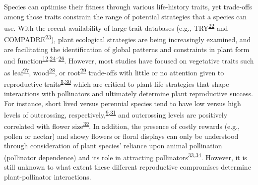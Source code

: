 \documentclass[
  12pt,
  a4paper,
]{article}
\begin{document}
Species can optimise their fitness through various life-history traits, yet trade-offs among those traits constrain the range of potential strategies that a species can use. With the recent availability of large trait databases (e.g., TRY\textsuperscript{\protect\hyperlink{ref-kattge2011}{22}} and COMPADRE\textsuperscript{\protect\hyperlink{ref-salguero2015}{23}}), plant ecological strategies are being increasingly examined, and are facilitating the identification of global patterns and constraints in plant form and function\textsuperscript{\protect\hyperlink{ref-salguero2016}{12},\protect\hyperlink{ref-diaz2016}{24}--\protect\hyperlink{ref-carmona2021}{26}}. However, most studies have focused on vegetative traits such as leaf\textsuperscript{\protect\hyperlink{ref-wright2004}{27}}, wood\textsuperscript{\protect\hyperlink{ref-chave2009}{28}}, or root\textsuperscript{\protect\hyperlink{ref-laughlin2021}{29}} trade-offs with little or no attention given to reproductive traits\textsuperscript{\protect\hyperlink{ref-roddy2021}{5},\protect\hyperlink{ref-evojtko2020}{30}} which are critical to plant life strategies that shape interactions with pollinators and ultimately determine plant reproductive success. For instance, short lived versus perennial species tend to have low versus high levels of outcrossing, respectively,\textsuperscript{\protect\hyperlink{ref-moeller2017}{9},\protect\hyperlink{ref-barrett2003}{31}} and outcrossing levels are positively correlated with flower size\textsuperscript{\protect\hyperlink{ref-goodwillie2010}{32}}. In addition, the presence of costly rewards (e.g., pollen or nectar) and showy flowers or floral displays can only be understood through consideration of plant species' reliance upon animal pollination (pollinator dependence) and its role in attracting pollinators\textsuperscript{\protect\hyperlink{ref-ollerton2011}{33},\protect\hyperlink{ref-rodger2021}{34}}. However, it is still unknown to what extent these different reproductive compromises determine plant-pollinator interactions.
\end{document}
